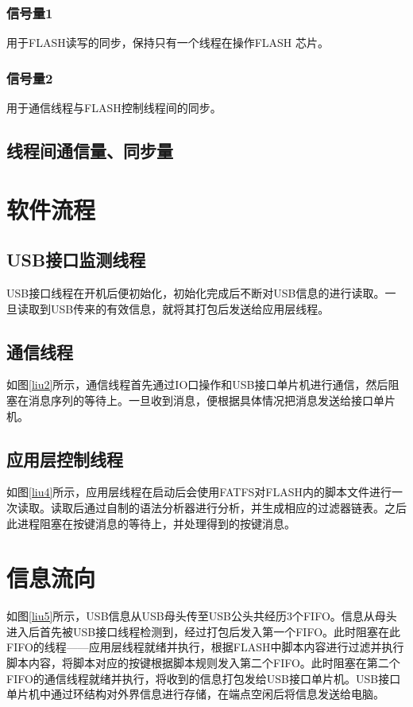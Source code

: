 \subsubsection{信号量1}
用于FLASH读写的同步，保持只有一个线程在操作FLASH 芯片。
\subsubsection{信号量2}
用于通信线程与FLASH控制线程间的同步。

\subsection{线程间通信量、同步量}

\section{软件流程}
\subsection{USB接口监测线程}
USB接口线程在开机后便初始化，初始化完成后不断对USB信息的进行读取。一旦读取到USB传来的有效信息，就将其打包后发送给应用层线程。

\subsection{通信线程}
如图\ref{liu2}所示，通信线程首先通过IO口操作和USB接口单片机进行通信，然后阻塞在消息序列的等待上。一旦收到消息，便根据具体情况把消息发送给接口单片机。

\subsection{应用层控制线程}
如图\ref{liu4}所示，应用层线程在启动后会使用FATFS对FLASH内的脚本文件进行一次读取。读取后通过自制的语法分析器进行分析，并生成相应的过滤器链表。之后此进程阻塞在按键消息的等待上，并处理得到的按键消息。

\section{信息流向}
如图\ref{liu5}所示，USB信息从USB母头传至USB公头共经历3个FIFO。信息从母头进入后首先被USB接口线程检测到，经过打包后发入第一个FIFO。此时阻塞在此FIFO的线程——应用层线程就绪并执行，根据FLASH中脚本内容进行过滤并执行脚本内容，将脚本对应的按键根据脚本规则发入第二个FIFO。此时阻塞在第二个FIFO的通信线程就绪并执行，将收到的信息打包发给USB接口单片机。USB接口单片机中通过环结构对外界信息进行存储，在端点空闲后将信息发送给电脑。


